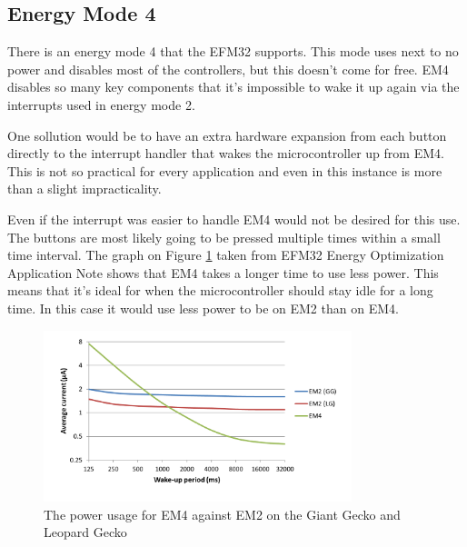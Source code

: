 \subsection{Energy Mode 4}
\label{subsec:em4}

There is an energy mode 4 that the EFM32 supports. This mode uses next to no power and disables most of the controllers, but this doesn't come for free. EM4 disables so many key components that it's impossible to wake it up again via the interrupts used in energy mode 2.

One sollution would be to have an extra hardware expansion from each button directly to the interrupt handler that wakes the microcontroller up from EM4. This is not so practical for every application and even in this instance is more than a slight impracticality.

Even if the interrupt was easier to handle EM4 would not be desired for this use. The buttons are most likely going to be pressed multiple times within a small time interval. The graph on Figure \ref{fig:em4} taken from EFM32 Energy Optimization Application Note \cite{efm32-energy-op} shows that EM4 takes a longer time to use less power. This means that it's ideal for when the microcontroller should stay idle for a long time. In this case it would use less power to be on EM2 than on EM4.

\begin{figure}[h!]
    \begin{center}
    \includegraphics[width=0.8\textwidth]{assets/img/em4.png}
    \caption{The power usage for EM4 against EM2 on the Giant Gecko and Leopard Gecko}
    \label{fig:em4}
    \end{center}
\end{figure}

